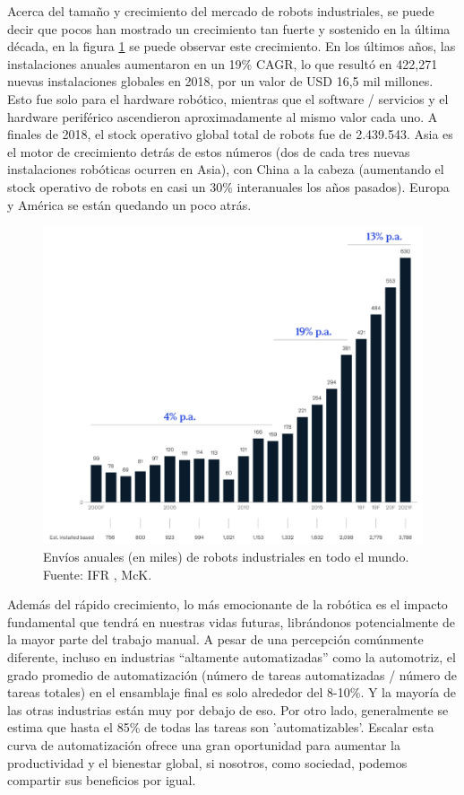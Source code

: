     Acerca del tamaño y crecimiento del mercado de robots industriales, se puede decir que pocos han mostrado un crecimiento tan fuerte y sostenido en la última década, en la figura \ref{f:Cap2_general_envios_anuales} se puede observar este crecimiento. En los últimos años, las instalaciones anuales aumentaron en un 19\% CAGR, lo que resultó en 422,271 nuevas instalaciones globales en 2018, por un valor de USD 16,5 mil millones. Esto fue solo para el hardware robótico, mientras que el software / servicios y el hardware periférico ascendieron aproximadamente al mismo valor cada uno. A finales de 2018, el stock operativo global total de robots fue de 2.439.543. Asia es el motor de crecimiento detrás de estos números (dos de cada tres nuevas instalaciones robóticas ocurren en Asia), con China a la cabeza (aumentando el stock operativo de robots en casi un 30\% interanuales los años pasados). Europa y América se están quedando un poco atrás. 
    \begin{figure}[H]
        \centering
        \includegraphics[width=0.67\linewidth]{Main/Chapter2/Images2/envios-anuales-robots.png}
        \caption{Envíos anuales (en miles) de robots industriales en todo el mundo. Fuente: IFR , McK.\cite{growth_Insights}}
        \label{f:Cap2_general_envios_anuales}
    \end{figure}
    Además del rápido crecimiento, lo más emocionante de la robótica es el impacto fundamental que tendrá en nuestras vidas futuras, librándonos potencialmente de la mayor parte del trabajo manual. A pesar de una percepción comúnmente diferente, incluso en industrias “altamente automatizadas” como la automotriz, el grado promedio de automatización (número de tareas automatizadas / número de tareas totales) en el ensamblaje final es solo alrededor del 8-10\%. Y la mayoría de las otras industrias están muy por debajo de eso. Por otro lado, generalmente se estima que hasta el 85\% de todas las tareas son 'automatizables'. Escalar esta curva de automatización ofrece una gran oportunidad para aumentar la productividad y el bienestar global, si nosotros, como sociedad, podemos compartir sus beneficios por igual.
    
